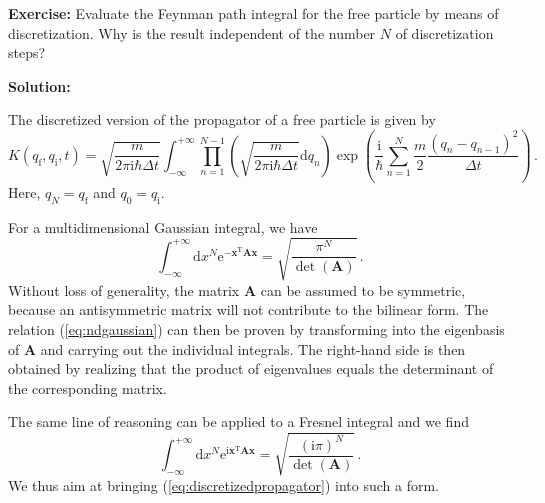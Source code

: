 \documentclass[11pt,DIV=19,parskip=half]{scrartcl}
\begin{document}


\vspace{0.5truecm}
\textbf{Exercise:} Evaluate the Feynman path integral for the free particle by means of
discretization. Why is the result independent of the number $N$ of discretization steps?


\vspace{0.5truecm}
\textbf{Solution:}

The discretized version of the propagator of a free particle is given by
\begin{equation}
 \label{eq:discretizedpropagator}
 K(q_\text{f}, q_\text{i}, t)
 = \sqrt{\frac{m}{2\pi\text{i}\hbar\Delta t}}\int_{-\infty}^{+\infty}
   \prod_{n=1}^{N-1}\left(\sqrt{\frac{m}{2\pi\text{i}\hbar\Delta t}}\text{d}q_n\right)
   \exp\left(\frac{\text{i}}{\hbar}\sum_{n=1}^N\frac{m}{2}\frac{(q_n-q_{n-1})^2}{\Delta t}\right)\,.
\end{equation}
Here, $q_N=q_\text{f}$ and $q_0=q_\text{i}$.

For a multidimensional Gaussian integral, we have
\begin{equation}
 \label{eq:ndgaussian}
 \int_{-\infty}^{+\infty}\text{d}x^N \text{e}^{-\mathbf{x}^\text{T}\mathbf{A}\mathbf{x}} =
                \sqrt{\frac{\pi^N}{\det(\mathbf{A})}}\,.
\end{equation}
Without loss of generality, the matrix $\mathbf{A}$ can be assumed to be symmetric, because
an antisymmetric matrix will not contribute to the bilinear form. The relation (\ref{eq:ndgaussian})
can then be proven by transforming into the eigenbasis of $\mathbf{A}$ and carrying out the individual
integrals. The right-hand side is then obtained by realizing that the product of eigenvalues equals
the determinant of the corresponding matrix.

The same line of reasoning can be applied to a Fresnel integral and we find
\begin{equation}
 \label{eq:ndfresnel}
 \int_{-\infty}^{+\infty}\text{d}x^N \text{e}^{\text{i}\mathbf{x}^\text{T}\mathbf{A}\mathbf{x}} =
                \sqrt{\frac{(\text{i}\pi)^N}{\det(\mathbf{A})}}\,.
\end{equation}
We thus aim at bringing (\ref{eq:discretizedpropagator}) into such a form.
\end{document}
